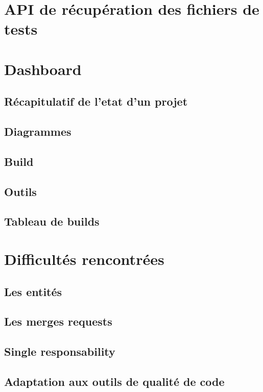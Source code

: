 	\section{API de récupération des fichiers de tests}
	\section{Dashboard}
		\subsection{Récapitulatif de l'etat d'un projet}
		\subsection{Diagrammes}
			\subsection{Build}
			\subsection{Outils}
		\subsection{Tableau de builds}
	\section{Difficultés rencontrées}
		\subsection{Les entités}
		\subsection{Les merges requests}
		\subsection{Single responsability}
		\subsection{Adaptation aux outils de qualité de code}